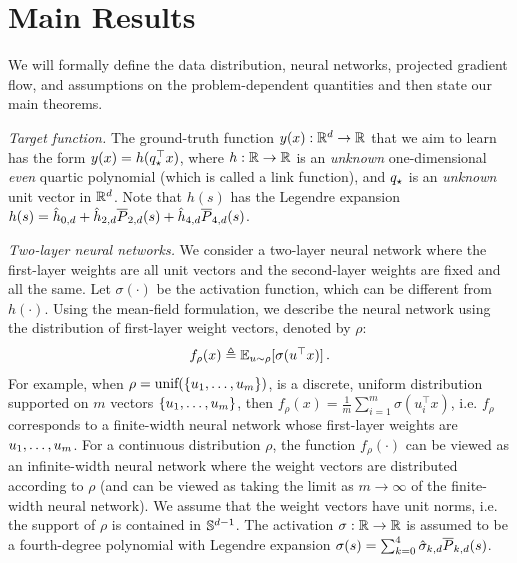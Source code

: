 \section{Main Results} \label{sec:main_results}






\newcommand{\period}{\,.}
\newcommand{\comma}{\,,}


We will formally define the data distribution, neural networks, projected gradient flow, and assumptions on the problem-dependent quantities and then state our main theorems. 

\textit{Target function.} The ground-truth function $y(x) : \mathbb{R}^d \rightarrow \mathbb{R}$ that we aim to learn has the form $
y(x) = h(q_\star^\top x)$, where $h: \mathbb{R} \rightarrow \mathbb{R}$ is an \textit{unknown} one-dimensional \textit{even} quartic polynomial (which is called a link function), and $q_\star$ is an \textit{unknown} unit vector in $\mathbb{R}^d$.  Note that $h(s)$ has the Legendre expansion  $h(s) = \hat{h}_{0, d}+ \hat{h}_{2, d} \overline{P}_{2, d}(s) + \hat{h}_{4, d} \overline{P}_{4, d}(s)$. %

\textit{Two-layer neural networks.} We consider a two-layer neural network where the first-layer weights are all unit vectors and the second-layer weights are fixed and all the same. Let $\sigma(\cdot)$ be the activation function, which can be different from $h(\cdot)$. Using the mean-field formulation, we describe the neural network using the distribution of first-layer weight vectors, denoted by $\rho$:
\begin{align}
\textstyle{f_\rho(x) \triangleq \Exp_{u\sim \rho}[\sigma(u^\top x)]\period} \label{eqn:12}
\end{align}
For example, when $\rho = \textup{unif}(\{u_1, \ldots, u_m\})$, is a discrete, uniform distribution supported on $m$ vectors $\{u_1, \ldots, u_m\}$, then $f_\rho(x) = \frac 1 m \sum_{i=1}^{m} \sigma(u_i^\top x)$, i.e. $f_\rho$ corresponds to a finite-width neural network whose first-layer weights are $u_1, \ldots, u_m$. For a continuous distribution $\rho$, the function $f_\rho(\cdot)$ can be viewed as an infinite-width neural network where the weight vectors are distributed according to $\rho$ (and can be viewed as taking the limit as $m \to \infty$ of the finite-width neural network). We assume that the weight vectors have unit norms, i.e. the support of $\rho$ is contained in $\mathbb{S}^{d - 1}$. The activation $\sigma: \mathbb{R} \to \mathbb{R}$ is assumed to be a fourth-degree polynomial with Legendre expansion $\sigma(s) = \sum_{k=0}^4 \hat{\sigma}_{k, d} \overline{P}_{k, d}(s)$.  


